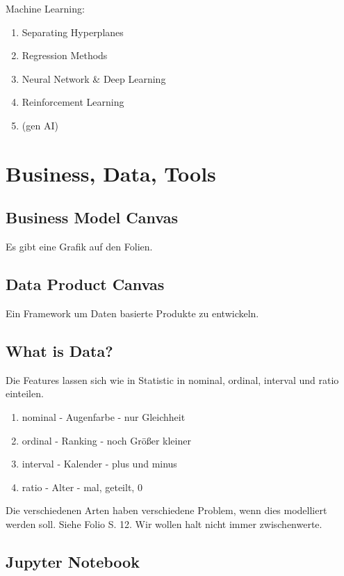\documentclass[a4paper]{article}
\begin{document}
Machine Learning:

\begin{enumerate}
    \item Separating Hyperplanes
    \item Regression Methods
    \item Neural Network \& Deep Learning
    \item Reinforcement Learning
    \item (gen AI)
\end{enumerate}

\section{Business, Data, Tools}

\subsection{Business Model Canvas}

Es gibt eine Grafik auf den Folien.

\subsection{Data Product Canvas}

Ein Framework um Daten basierte Produkte zu entwickeln.

\subsection{What is Data?}

Die Features lassen sich wie in Statistic in nominal, ordinal, interval und ratio einteilen.

\begin{enumerate}
    \item nominal - Augenfarbe - nur Gleichheit
    \item ordinal - Ranking - noch Größer kleiner
    \item interval - Kalender - plus und minus
    \item ratio - Alter - mal, geteilt, 0
\end{enumerate}

Die verschiedenen Arten haben verschiedene Problem, wenn dies modelliert werden soll. Siehe Folio S. 12. Wir wollen halt nicht immer zwischenwerte.

\subsection{Jupyter Notebook}
\end{document}
